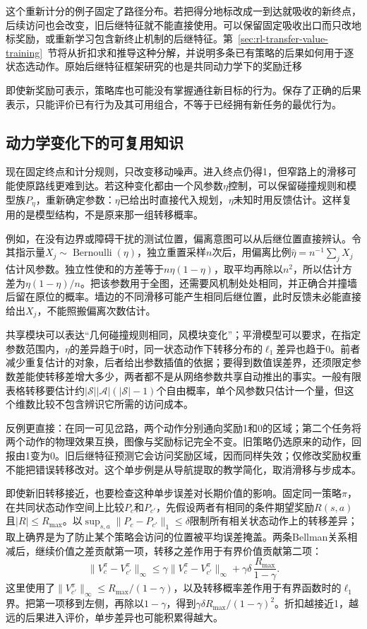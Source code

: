 这个重新计分的例子固定了路径分布。若把得分地标改成一到达就吸收的新终点，后续访问也会改变，旧后继特征就不能直接使用。可以保留固定吸收出口而只改地标奖励，或重新学习包含新终止机制的后继特征。第~\ref{sec:rl-transfer-value-training}~节将从折扣求和推导这种分解，并说明多条已有策略的后果如何用于逐状态选动作。原始后继特征框架研究的也是共同动力学下的奖励迁移

即使新奖励可表示，策略库也可能没有掌握通往新目标的行为。保存了正确的后果表示，只能评价已有行为及其可用组合，不等于已经拥有新任务的最优行为。

\subsection{动力学变化下的可复用知识}
\label{sec:rl-transfer-dynamics-change}

现在固定终点和计分规则，只改变移动噪声。进入终点仍得1，但窄路上的滑移可能使原路线更难到达。若这种变化都由一个风参数$\eta$控制，可以保留碰撞规则和模型族$P_\eta$，重新确定参数：$\eta$已给出时直接代入规划，$\eta$未知时用反馈估计。这样复用的是模型结构，不是原来那一组转移概率。

例如，在没有边界或障碍干扰的测试位置，偏离意图可以从后继位置直接辨认。令其指示量$X_j\sim\operatorname{Bernoulli}(\eta)$，独立重置采样$n$次后，用偏离比例$\widehat\eta=n^{-1}\sum_jX_j$估计风参数。独立性使和的方差等于$n\eta(1-\eta)$，取平均再除以$n^2$，所以估计方差为$\eta(1-\eta)/n$。把该参数用于全图，还需要风机制处处相同，并正确合并撞墙后留在原位的概率。墙边的不同滑移可能产生相同后继位置，此时反馈未必能直接给出$X_j$，不能照搬偏离次数估计。

共享模块可以表达“几何碰撞规则相同，风模块变化”；平滑模型可以要求，在指定参数范围内，$\eta$的差异趋于0时，同一状态动作下转移分布的$\ell_1$差异也趋于0。前者减少重复估计的对象，后者给出参数插值的依据；要得到数值误差界，还须限定参数差能使转移差增大多少，两者都不是从网络参数共享自动推出的事实。一般有限表格转移要估计约$|\mathcal S||\mathcal A|(|\mathcal S|-1)$个自由概率，单个风参数只估计一个量，但这个维数比较不包含辨识它所需的访问成本。

反例更直接：在同一可见岔路，两个动作分别通向奖励1和0的区域；第二个任务将两个动作的物理效果互换，图像与奖励标记完全不变。旧策略仍选原来的动作，回报由1变为0。旧后继特征预测它会访问奖励区域，因而同样失效；仅修改奖励权重不能把错误转移改对。这个单步例是从导航提取的教学简化，取消滑移与步成本。

即使新旧转移接近，也要检查这种单步误差对长期价值的影响。固定同一策略$\pi$，在共同状态动作空间上比较$P_c$和$P_{c'}$，先假设两者有相同的条件期望奖励$R(s,a)$且$|R|\leq R_{\max}$。以$\sup_{s,a}\lVert P_c-P_{c'}\rVert_1\leq\delta$限制所有相关状态动作上的转移差异；取上确界是为了防止某个策略会访问的位置被平均误差掩盖。两条Bellman关系相减后，继续价值之差贡献第一项，转移之差作用于有界价值贡献第二项：
\[
 \lVert V_c^\pi-V_{c'}^\pi\rVert_\infty
 \leq \gamma\lVert V_c^\pi-V_{c'}^\pi\rVert_\infty
      +\gamma\delta\,\frac{R_{\max}}{1-\gamma}.
\]
这里使用了$\lVert V_{c'}^\pi\rVert_\infty\leq R_{\max}/(1-\gamma)$，以及转移概率差作用于有界函数时的$\ell_1$界。把第一项移到左侧，再除以$1-\gamma$，得到$\gamma\delta R_{\max}/(1-\gamma)^2$。折扣越接近1，越远的后果进入评价，单步差异也可能积累得越大。

